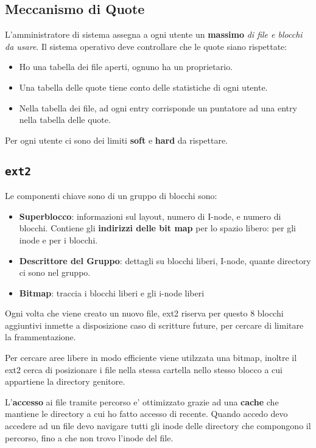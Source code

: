 \subsection{Meccanismo di Quote}
L'amministratore di sistema assegna a ogni utente un \textbf{massimo} \textit{di file e blocchi da usare}.
Il sistema operativo deve controllare che le quote siano rispettate:
\begin{itemize}
    \item Ho una tabella dei file aperti, ognuno ha un proprietario.
    \item Una tabella delle quote tiene conto delle statistiche di ogni utente.
    \item Nella tabella dei file, ad ogni entry corrisponde un puntatore ad una entry nella tabella delle quote.
\end{itemize}
Per ogni utente ci sono dei limiti  \textbf{soft} e \textbf{hard} da rispettare.

\subsection{\texttt{ext2}}
Le componenti  chiave sono di un gruppo di blocchi sono:
\begin{itemize}
    \item \textbf{Superblocco}: informazioni sul layout, numero di I-node, e numero di blocchi. Contiene gli \textbf{indirizzi delle bit map} per lo spazio libero: per gli inode e per i blocchi.
    \item \textbf{Descrittore del Gruppo}: dettagli su blocchi liberi, I-node, quante directory ci sono nel gruppo.
    \item \textbf{Bitmap}: traccia i  blocchi liberi e gli i-node liberi
\end{itemize}

Ogni volta che viene creato un nuovo file, ext2 riserva per questo 8 blocchi aggiuntivi inmette a disposizione caso
di scritture future, per cercare di limitare la frammentazione.

Per cercare aree libere in modo efficiente viene utilzzata una bitmap, inoltre il ext2 cerca di posizionare i file
nella stessa cartella nello stesso blocco a cui appartiene la directory genitore.

L'\textbf{accesso} ai file tramite percorso e' ottimizzato grazie ad una \textbf{cache} che mantiene le 
directory a cui ho fatto accesso di recente. Quando accedo devo accedere ad un file devo navigare tutti gli 
inode delle directory che compongono il percorso, fino a che non trovo l'inode del file.


